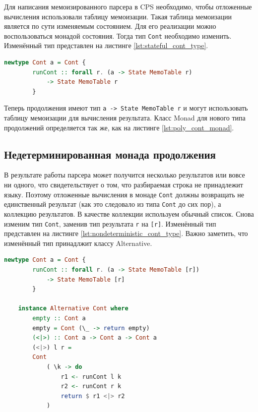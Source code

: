 \documentclass[times]{itmo-student-thesis}
\begin{document}
Для написания мемоизированного парсера в CPS необходимо, чтобы отложенные вычисления использовали таблицу мемоизации. 
Такая таблица мемоизации является по сути изменяемым состоянием. Для его реализации можно воспользоваться монадой состояния.
Тогда тип \lstinline{Cont} необходимо изменить. Изменённый тип представлен на листинге \ref{lst:stateful_cont_type}.

\begin{lstlisting}[language=Haskell,float=!h,caption={Тип Cont с состоянием},label={lst:stateful_cont_type}]
    newtype Cont a = Cont { 
        runCont :: forall r. (a -> State MemoTable r) 
            -> State MemoTable r 
        }
\end{lstlisting}

Теперь продолжения имеют тип \lstinline{a -> State MemoTable r} и могут использовать таблицу мемоизации для вычисления результата.
Класс Monad для нового типа продолжений определяется так же, как на листинге \ref{lst:poly_cont_monad}.

\subsection{Недетерминированная монада продолжения}\label{sec:contt_transformer}

В результате работы парсера может получится несколько результатов или вовсе ни одного, что свидетельствует о том, что 
разбираемая строка не принадлежит языку. Поэтому отложенные вычисления в монаде \lstinline{Cont} должны возвращать не 
единственный результат (как это следовало из типа \lstinline{Cont} до сих пор), а коллекцию результатов. В качестве коллекции используем обычный список.
Снова изменим тип \lstinline{Cont}, заменив тип результата \lstinline{r} на \lstinline{[r]}. Изменённый тип представлен на листинге \ref{lst:nondeterministic_cont_type}.
Важно заметить, что изменённый тип принадлжит классу Alternative.

\begin{lstlisting}[language=Haskell,float=!h,caption={Недетерминированная монада продолжения с состоянием},label={lst:nondeterministic_cont_type}]
    newtype Cont a = Cont { 
        runCont :: forall r. (a -> State MemoTable [r]) 
            -> State MemoTable [r] 
        }

    instance Alternative Cont where
        empty :: Cont a
        empty = Cont (\_ -> return empty)
        (<|>) :: Cont a -> Cont a -> Cont a
        (<|>) l r =
        Cont
            ( \k -> do
                r1 <- runCont l k
                r2 <- runCont r k
                return $ r1 <|> r2
            )
\end{lstlisting}
\end{document}
